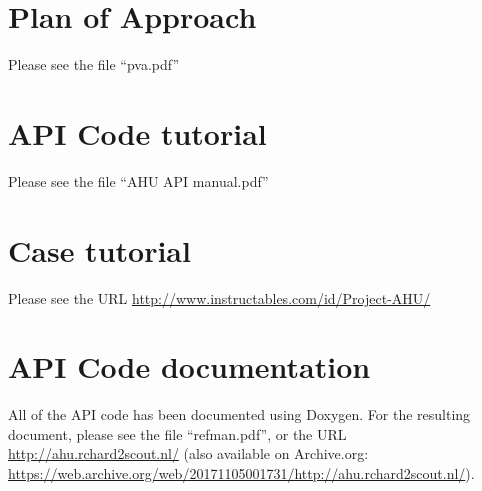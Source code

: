 \documentclass[a4paper,oneside]{book}
\begin{document}
\chapter{Plan of Approach}
\label{app:plan-of-approach}
Please see the file ``pva.pdf''

\chapter{API Code tutorial}
Please see the file ``AHU API manual.pdf''

\chapter{Case tutorial}
Please see the URL \url{http://www.instructables.com/id/Project-AHU/}

\chapter{API Code documentation}
All of the API code has been documented using Doxygen. For the resulting
document, please see the file ``refman.pdf'', or the URL
\url{http://ahu.rchard2scout.nl/} (also available on Archive.org:
\url{https://web.archive.org/web/20171105001731/http://ahu.rchard2scout.nl/}).
\end{document}
